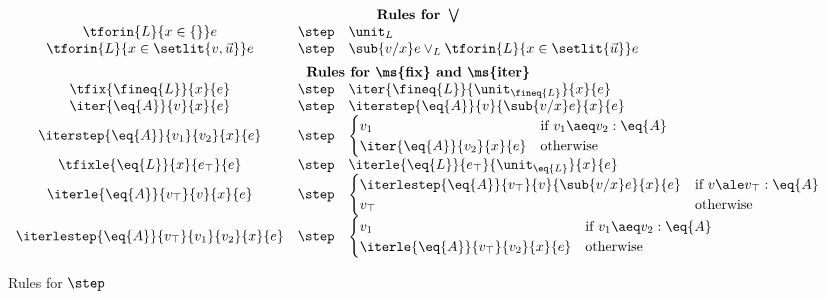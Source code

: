 \begin{figure}
\begin{displaymath}
\begin{array}{ccl}
      \vspace{0.5em}\\
      \multicolumn{3}{c}{\textbf{Rules for }\bigvee}\\
      \tforin{L}{x \in \{\}} e &\step& \unit_L\\
      \tforin{L}{x \in \setlit{v, \vec{u}}} e
      &\step& \sub{v/x} e \vee_L \tforin{L}{x \in \setlit{\vec{u}}} e
      \vspace{0.5em}\\
      \multicolumn{3}{c}{\textbf{Rules for \ms{fix} and \ms{iter}}}\\
      \tfix{\fineq{L}}{x}{e} &\step& \iter{\fineq{L}}{\unit_{\fineq{L}}}{x}{e}\\
      \iter{\eq{A}}{v}{x}{e} &\step& \iterstep{\eq{A}}{v}{\sub{v/x} e}{x}{e}\\
      \iterstep{\eq{A}}{v_1}{v_2}{x}{e}
      &\step& \begin{cases}
        v_1 & \text{if}~{v_1 \aeq v_2 : \eq{A}}\\
        \iter{\eq{A}}{v_2}{x}{e} & \text{otherwise}
      \end{cases}\\
      \tfixle{\eq{L}}{x}{e_\top}{e} &\step& \iterle{\eq{L}}{e_\top}{\unit_{\eq{L}}}{x}{e}\\
      \iterle{\eq{A}}{v_\top}{v}{x}{e}
      &\step& \begin{cases}
        \iterlestep{\eq{A}}{v_\top}{v}{\sub{v/x} e}{x}{e} & \text{if}~{v \ale v_\top : \eq{A}}\\
        v_\top & \text{otherwise}
      \end{cases}\\
      \iterlestep{\eq{A}}{v_\top}{v_1}{v_2}{x}{e}
      &\step& \begin{cases}
        v_1 &\text{if}~{v_1 \aeq v_2 : \eq{A}}\\
        \iterle{\eq{A}}{v_\top}{v_2}{x}{e} & \text{otherwise}
      \end{cases}
    \end{array}
  \end{displaymath}
  \caption{Rules for $\step$}
  \label{fig:opsem-rules}
\end{figure}

